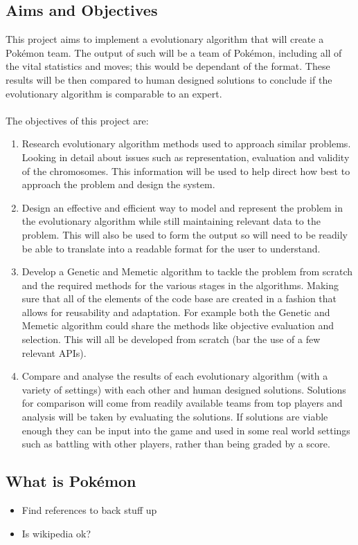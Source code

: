 \documentclass[a4paper]{article}
\newcommand{\Pokemon}{Pok\'{e}mon}
\begin{document}
\subsection{Aims and Objectives}
\par
This project aims to implement a evolutionary algorithm that will create a \Pokemon{} team.
The output of such will be a team of \Pokemon{}, including all of the vital statistics and moves; this would be dependant of the format.
These results will be then compared to human designed solutions to conclude if the evolutionary algorithm is comparable to an expert.
\\ \\The objectives of this project are:
\begin{enumerate}
    \item Research evolutionary algorithm methods used to approach similar problems.
    Looking in detail about issues such as representation, evaluation and validity of the chromosomes.
    This information will be used to help direct how best to approach the problem and design the system.
    \item Design an effective and efficient way to model and represent the problem in the evolutionary algorithm while still maintaining relevant data to the problem.
    This will also be used to form the output so will need to be readily be able to translate into a readable format for the user to understand.
    \item Develop a Genetic and Memetic algorithm to tackle the problem from scratch and the required methods for the various stages in the algorithms.
    Making sure that all of the elements of the code base are created in a fashion that allows for reusability and adaptation.
    For example both the Genetic and Memetic algorithm could share the methods like objective evaluation and selection.
    This will all be developed from scratch (bar the use of a few relevant APIs).
    \item Compare and analyse the results of each evolutionary algorithm (with a variety of settings) with each other and human designed solutions.
    Solutions for comparison will come from readily available teams from top players and analysis will be taken by evaluating the solutions.
    If solutions are viable enough they can be input into the game and used in some real world settings such as battling with other players, rather than being graded by a score.
\end{enumerate}

\subsection{What is \Pokemon{}}
\begin{itemize}
	\item Find references to back stuff up
	\item Is wikipedia ok?
\end{itemize}
\end{document}
